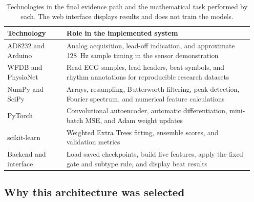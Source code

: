 \begin{table}[H]
\centering
\small
\caption{Technologies in the final evidence path and the mathematical task
performed by each. The web interface displays results and does not train the
models.}
\label{tab:theory-technology-roles}
\begin{tabular}{>{\raggedright\arraybackslash}p{3.2cm}>{\raggedright\arraybackslash}p{9.6cm}}
\toprule
Technology & Role in the implemented system\\
\midrule
AD8232 and Arduino & Analog acquisition, lead-off indication, and approximate
128~Hz sample timing in the sensor demonstration\\
WFDB and PhysioNet & Read ECG samples, lead headers, beat symbols, and rhythm
annotations for reproducible research datasets\\
NumPy and SciPy & Arrays, resampling, Butterworth filtering, peak detection,
Fourier spectrum, and numerical feature calculations \cite{virtanen2020scipy}\\
PyTorch & Convolutional autoencoder, automatic differentiation,
mini-batch MSE, and Adam weight updates \cite{paszke2019pytorch}\\
scikit-learn & Weighted Extra Trees fitting, ensemble scores, and validation
metrics\\
Backend and interface & Load saved checkpoints, build live features, apply
the fixed gate and subtype rule, and display beat results\\
\bottomrule
\end{tabular}
\end{table}

\subsection{Why this architecture was selected}

